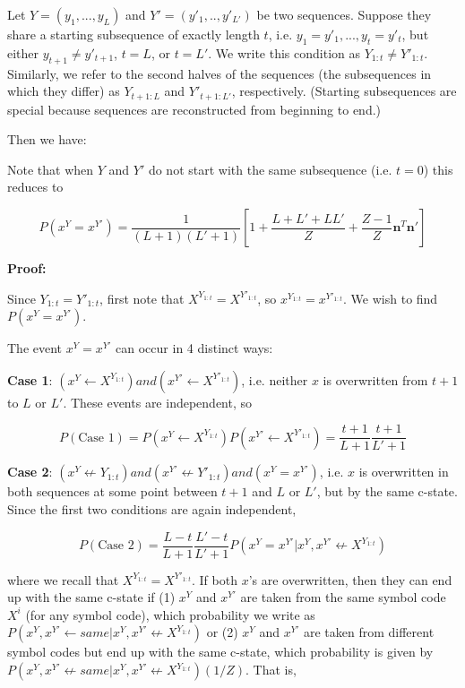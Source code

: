 \documentclass{article}
\begin{document}
Let $Y = (y_1, ..., y_L)$ and $Y' = (y'_1, .., y'_{L'})$ be two sequences. Suppose they share a starting subsequence of exactly length $t$, i.e. $y_1 = y'_1, ..., y_t = y'_t$, but either $y_{t+1} \neq y'_{t+1}$, $t = L$, or $t = L'$. We write this condition as $Y_{1:t} \neq Y'_{1:t}$. Similarly, we refer to the second halves of the sequences (the subsequences in which they differ) as $Y_{t+1:L}$ and $Y'_{t+1:L'}$, respectively. (Starting subsequences are special because sequences are reconstructed from beginning to end.)

Then we have:

Note that when $Y$ and $Y'$ do not start with the same subsequence (i.e. $t = 0$) this reduces to

$$P(x^Y = x^{Y'}) = \frac{1}{(L+1)(L'+1)}\left[1 + \frac{L + L' + LL'}{Z} + \frac{Z-1}{Z}\mathbf{n}^T\mathbf{n}'\right]$$

\textbf{Proof:}

Since $Y_{1:t} = Y'_{1:t}$,  first note that $X^{Y_{1:t}} = X^{Y'_{1:t}}$, so $x^{Y_{1:t}} = x^{Y'_{1:t}}$. We wish to find $P(x^Y = x^{Y'})$.

The event $x^Y = x^{Y'}$ can occur in 4 distinct ways:

\textbf{Case 1}: $(x^Y \leftarrow X^{Y_{1:t}}) and (x^{Y'} \leftarrow X^{Y'_{1:t}})$, i.e. neither $x$ is overwritten from $t+1$ to $L$ or $L'$. These events are independent, so

$$P(\textrm{Case 1}) = P(x^Y \leftarrow X^{Y_{1:t}})P(x^{Y'} \leftarrow X^{Y'_{1:t}}) = \frac{t+1}{L+1}\frac{t+1}{L'+1}$$

\textbf{Case 2}: $(x^Y \not\leftarrow Y_{1:t}) and (x^{Y'} \not\leftarrow Y'_{1:t}) and (x^Y = x^{Y'})$, i.e. $x$ is overwritten in both sequences at some point between $t+1$ and $L$ or $L'$, but by the same c-state. Since the first two conditions are again independent, 

$$P(\textrm{Case 2}) = \frac{L-t}{L+1}\frac{L'-t}{L'+1}P(x^Y = x^{Y'}|x^Y, x^{Y'} \not\leftarrow X^{Y_{1:t}})$$

where we recall that $X^{Y_{1:t}} = X^{Y'_{1:t}}$. If both $x$'s are overwritten, then they can end up with the same c-state if (1) $x^Y$ and $x^{Y'}$ are taken from the same symbol code $X^i$ (for any symbol code), which probability we write as $P(x^Y, x^{Y'} \leftarrow same|x^Y, x^{Y'} \not\leftarrow X^{Y_{1:t}})$ or (2) $x^Y$ and $x^{Y'}$ are taken from different symbol codes but end up with the same c-state, which probability is given by $P(x^Y, x^{Y'} \not\leftarrow same|x^Y, x^{Y'} \not\leftarrow X^{Y_{1:t}})(1/Z)$. That is,
\end{document}

